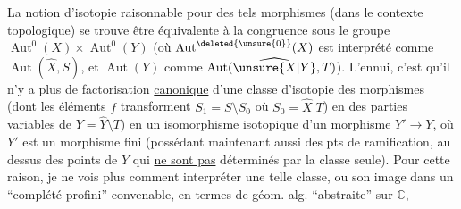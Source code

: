 La notion d'isotopie raisonnable pour des
tels morphismes (dans le contexte topologique)
se trouve être équivalente à la congruence
sous le groupe $\operatorname{Aut}^0(X)\times\operatorname{Aut}^0(Y)$
(où $\operatorname{Aut}^{\deleted{\unsure{0}}}(X)$ est interprété comme $\operatorname{Aut}(\widehat X,S)$,
et $\operatorname{Aut}(Y)$ comme $\operatorname{Aut}(\widehat{\unsure{X|Y}},T)$). L'ennui,
c'est qu'il n'y a plus de factorisation
\uline{canonique} d'une classe d'isotopie des
morphismes  (dont les éléments  $f$
transforment $S_1=S\setminus S_0$ où $S_0=\widehat X|T$) en
des parties variables de $Y=\widehat Y\setminus T$) en
un isomorphisme  isotopique  
 d'un morphisme $Y'\longrightarrow Y$, où $Y'$ est un
morphisme fini (possédant maintenant aussi
 des pts de ramification, au dessus des
points de $Y$ qui \uline{ne sont pas} déterminés
par la classe seule). Pour cette raison,
je ne vois plus comment interpréter une
telle classe, ou son image dans un
 ``complété profini'' convenable,
en termes de géom. alg. ``abstraite'' sur $\mathbb C$,
